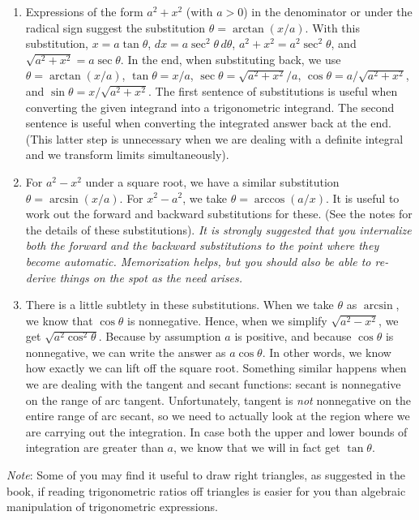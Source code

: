 \documentclass[10pt]{amsart}
\begin{document}
\begin{enumerate}
\item Expressions of the form $a^2 + x^2$ (with $a > 0$) in the
  denominator or under the radical sign suggest the substitution
  $\theta = \arctan(x/a)$. With this substitution, $x = a \tan
  \theta$, $dx = a \sec^2 \theta \, d\theta$, $a^2 + x^2 = a^2 \sec^2
  \theta$, and $\sqrt{a^2 + x^2} = a \sec \theta$. In the end, when
  substituting back, we use $\theta = \arctan(x/a)$, $\tan \theta =
  x/a$, $\sec \theta = \sqrt{a^2 + x^2}/a$, $\cos \theta = a/\sqrt{a^2
  + x^2}$, and $\sin \theta = x/\sqrt{a^2 + x^2}$. The first sentence
  of substitutions is useful when converting the given integrand into
  a trigonometric integrand. The second sentence is useful when
  converting the integrated answer back at the end. (This latter step
  is unnecessary when we are dealing with a definite integral and we
  transform limits simultaneously).
\item For $a^2 - x^2$ under a square root, we have a similar
  substitution $\theta = \arcsin(x/a)$. For $x^2 - a^2$, we take
  $\theta = \arccos(a/x)$. It is useful to work out the forward and
  backward substitutions for these. (See the notes for the details of
  these substitutions). {\em It is strongly suggested that you
  internalize both the forward and the backward substitutions to the
  point where they become automatic. Memorization helps, but you
  should also be able to re-derive things on the spot as the need
  arises.}
\item There is a little subtlety in these substitutions. When we take
  $\theta$ as $\arcsin$, we know that $\cos \theta$ is
  nonnegative. Hence, when we simplify $\sqrt{a^2 - x^2}$, we get
  $\sqrt{a^2\cos^2 \theta}$. Because by assumption $a$ is positive,
  and because $\cos \theta$ is nonnegative, we can write the answer as
  $a\cos \theta$. In other words, we know how exactly we can lift off
  the square root. Something similar happens when we are dealing with
  the tangent and secant functions: secant is nonnegative on the range
  of arc tangent. Unfortunately, tangent is {\em not} nonnegative on
  the entire range of arc secant, so we need to actually look at the
  region where we are carrying out the integration. In case both the
  upper and lower bounds of integration are greater than $a$, we know
  that we will in fact get $\tan \theta$.
\end{enumerate}

{\em Note}: Some of you may find it useful to draw right triangles, as
suggested in the book, if reading trigonometric ratios off triangles
is easier for you than algebraic manipulation of trigonometric
expressions.
\end{document}
